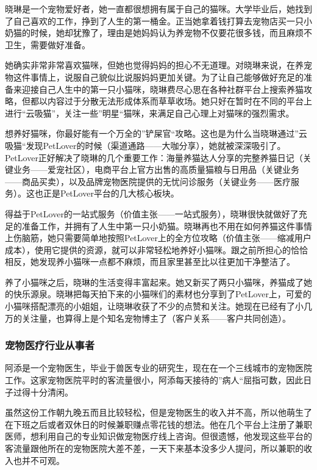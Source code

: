 \documentclass[a4paper]{ctexart}
\begin{document}
晓琳是一个宠物爱好者，她一直都很想拥有属于自己的猫咪。大学毕业后，她找到了自己喜欢的工作，挣到了人生的第一桶金。正当她拿着钱打算去宠物店买一只小奶猫的时候，她却犹豫了，理由是她妈妈认为养宠物不仅要花很多钱，而且麻烦不卫生，需要做好准备。

她确实非常非常喜欢猫咪，但她也觉得妈妈的担心不无道理。对晓琳来说，在养宠物这件事情上，说服自己貌似比说服妈妈更加关键。为了让自己能够做好充足的准备来迎接自己人生中的第一只小猫咪，晓琳费尽心思在各种社群平台上搜索养猫攻略，但都以内容过于分散无法形成体系而草草收场。她只好在暂时在不同的平台上进行“云吸猫”，关注一些”明星“猫咪，来满足自己心理上对猫咪的强烈需求。

想养好猫咪，你最好能有一个万全的”铲屎官“攻略。这也是为什么当晓琳通过”云吸猫“发现PetLover的时候（渠道通路——大咖分享），她就被深深吸引了。PetLover正好解决了晓琳的几个重要工作：海量养猫达人分享的完整养猫日记（关键业务——爱宠社区），电商平台上官方出售的高质量猫粮与日用品（关键业务——商品买卖），以及品牌宠物医院提供的无忧问诊服务（关键业务——医疗服务）。这也正是PetLover平台的几大核心板块。

得益于PetLover的一站式服务（价值主张——一站式服务），晓琳很快就做好了充足的准备工作，并拥有了人生中第一只小奶猫。晓琳再也不用在如何养猫这件事情上伤脑筋，她只需要简单地按照PetLover上的全方位攻略（价值主张——缩减用户成本），使用它提供的资源，就可以非常轻松地养好小猫咪。跟之前所担心的恰恰相反，她发现养小猫咪一点都不麻烦，而且家里甚至比以往更加干净整洁了。

养了小猫咪之后，晓琳的生活变得丰富起来。她又新买了两只小猫咪，养猫成了她的快乐源泉。晓琳把每天拍下来的小猫咪们的素材也分享到了PetLover上，可爱的小猫咪搭配漂亮的小姐姐，让晓琳收获了不少的点赞和关注。她现在已经有了小几万的关注量，也算得上是个知名宠物博主了（客户关系——客户共同创造）。

\subsubsection{宠物医疗行业从事者}

阿添是一个宠物医生，毕业于兽医专业的研究生，现在在一个三线城市的宠物医院工作。这家宠物医院平时的客流量很小，阿添每天接待的”病人“屈指可数，因此日子过得十分清闲。

虽然这份工作朝九晚五而且比较轻松，但是宠物医生的收入并不高，所以他萌生了在下班之后或者双休日的时候兼职赚点零花钱的想法。他在几个平台上注册了兼职医师，想利用自己的专业知识做宠物医疗线上咨询。但很遗憾，他发现这些平台的客流量跟他所在的宠物医院大差不差，一天下来基本没多少人提问，所以兼职的收入也并不可观。
\end{document}
